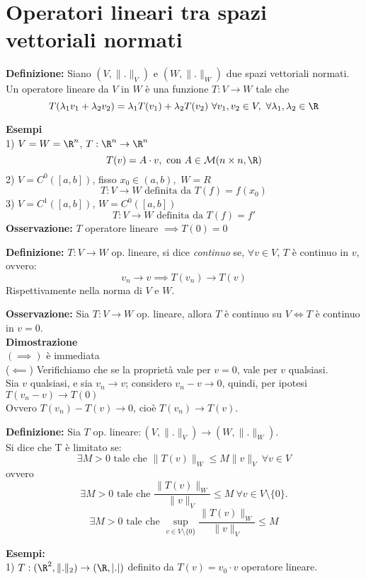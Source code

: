 \section{Operatori lineari tra spazi vettoriali normati}
\begin{tcolorbox}
\textbf{Definizione: }Siano $(V,\|.\|_V)$ e $(W,\|.\|_W)$ due spazi vettoriali normati.
\\Un operatore lineare da $V$ in $W$ è una funzione  $T:V\to W$ tale che
\[T(\lambda_1v_1+\lambda_2v_2)=\lambda_1T(v_1)+\lambda_2T(v_2) \ \forall v_1,v_2\in V,\  \forall \lambda_1,\lambda_2\in \R\]
\end{tcolorbox}
\textbf{Esempi} 
\\1) $V=W=\R^n$, $T:\R^n\to \R^n$ 
\[T(v)=A\cdot v,\text{ con }A\in \mathcal M (n\times n,\R)\]
2) $V=C^0([a,b])$, fisso $x_0\in (a,b),$ $W=R$
\[T:V\to W\text{ definita da }T(f)=f(x_0)\]
3) $V=C^1([a,b])$, $W=C^0([a,b])$
\[T:V \to W\text{ definita da }T(f)=f'\]
\textbf{Osservazione:} $T$ operatore lineare $\implies T(0)=0$
\begin{tcolorbox}
\textbf{Definizione: } $T:V\to W$ op. lineare, si dice \emph{continuo} se, $\forall v\in V$, $T$ è continuo in $v$, ovvero:
\[v_n \to v\implies T(v_n)\to T(v)\]
Rispettivamente nella norma di $V$ e $W$.
\end{tcolorbox}
\textbf{Osservazione: }Sia $T:V\to W$ op. lineare, allora $T$ è continuo su $V\iff T$ è continuo in $v=0$.
\\\textbf{Dimostrazione} 
\\$(\implies)$ è immediata 
\\($\impliedby$) Verifichiamo che se la proprietà vale per $v=0$, vale per $v$ qualsiasi.
\\Sia $v$ qualsiasi, e sia $v_n\to v$; considero $v_n-v\to 0$, quindi, per ipotesi $T(v_n-v)\to T(0)$
\\Ovvero $T(v_n)- T(v)\to 0$, cioè $T(v_n)\to T(v)$.
\\\divider
\begin{tcolorbox}
	\textbf{Definizione: } Sia $T$ op. lineare$:(V,\|.\|_V)\to (W,\|.\|_W)$.
	\\Si dice che T è limitato se:
	\[\exists  M>0\text{ tale che }\|T(v)\|_W\le M\|v\|_V\ \forall v\in V\]
	ovvero
	\[\exists  M>0 \text{ tale che } \frac{\|T(v)\|_W}{\|v\|_V}\le M\ \forall v\in V\setminus\{0\}.\]
	\[\exists  M>0 \text{ tale che } \sup_{v\in V\setminus \{0\} }\frac{\|T(v)\|_W}{\|v\|_V}\le M\]
\end{tcolorbox}
\textbf{Esempi:} 
\\1) $T:(\R^2,\|.\|_2)\to (\R,|.|)$ definito da $T(v)=v_0\cdot v$ operatore lineare.
